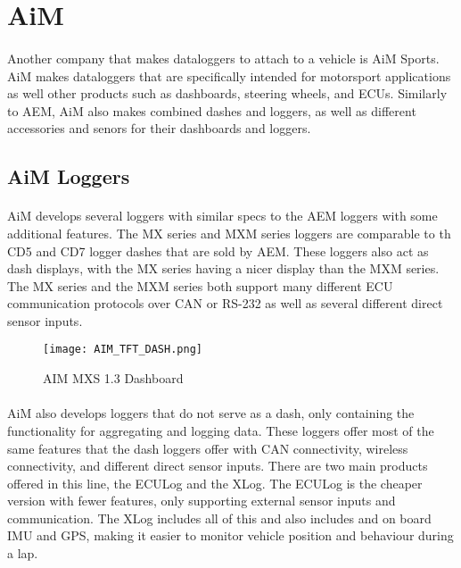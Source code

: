 \section{AiM}

\paragraph{}
Another company that makes dataloggers to attach to a vehicle is AiM Sports.
AiM makes dataloggers that are specifically intended for motorsport applications as well other products such as dashboards, steering wheels, and ECUs.
Similarly to AEM, AiM also makes combined dashes and loggers, as well as different accessories and senors for their dashboards and loggers.

\subsection{AiM Loggers}

\paragraph{}
AiM develops several loggers with similar specs to the AEM loggers with some additional features.
The MX series and MXM series loggers are comparable to th CD5 and CD7 logger dashes that are sold by AEM.
These loggers also act as dash displays, with the MX series having a nicer display than the MXM series.
The MX series and the MXM series both support many different ECU communication protocols over CAN or RS-232 as well as several different direct sensor inputs.

\begin{figure}[H]
	\centering
	\texttt{[image: AIM\_TFT\_DASH.png]}
	\caption{AIM MXS 1.3 Dashboard}
	\label{fig:AIM_TFT}
\end{figure}

\paragraph{}
AiM also develops loggers that do not serve as a dash, only containing the functionality for aggregating and logging data.
These loggers offer most of the same features that the dash loggers offer with CAN connectivity, wireless connectivity, and different direct sensor inputs.
There are two main products offered in this line, the ECULog and the XLog.
The ECULog is the cheaper version with fewer features, only supporting external sensor inputs and communication.
The XLog includes all of this and also includes and on board IMU and GPS, making it easier to monitor vehicle position and behaviour during a lap.


